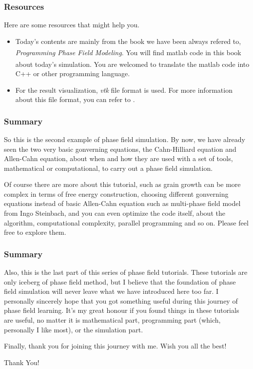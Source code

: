 \documentclass[compress,xcolor={dvipsnames}]{beamer}
\newcommand{\bhref}[2]{
    \href{#1}{\color{blue}{#2}}
}
\begin{document}
\begin{frame}
    \frametitle{Resources}

    Here are some resources that might help you.
    \begin{itemize}
        \item Today's contents are mainly from the book we have been always refered to, \emph{Programming Phase Field Modeling}. You will find matlab\textsuperscript{\textregistered} code in this book about today's simulation. You are welcomed to translate the matlab\textsuperscript{\textregistered} code into C++ or other programming language.
        \item For the result visualization, \emph{vtk} file format is used. For more information about this file format, you can refer to \bhref{https://docs.vtk.org/en/latest/design_documents/VTKFileFormats.html}{VTK file format reference}.
    \end{itemize}
\end{frame}

\begin{frame}
    \frametitle{Summary}

    So this is the second example of phase field simulation. By now, we have already seen the two very basic gonverning equations, the Cahn-Hilliard equation and Allen-Cahn equation, about when and how they are used with a set of tools, mathematical or computational, to carry out a phase field simulation.

    Of course there are more about this tutorial, such as grain growth can be more complex in terms of free energy construction, choosing different gonverning equations instead of basic Allen-Cahn equation such as multi-phase field model from Ingo Steinbach, and you can even optimize the code itself, about the algorithm, computational complexity, parallel programming and so on. Please feel free to explore them.

\end{frame}

\begin{frame}
    \frametitle{Summary}

    Also, this is the last part of this series of phase field tutorials. These tutorials are only iceberg of phase field method, but I believe that the foundation of phase field simulation will never leave what we have introduced here too far. I personally sincerely hope that you got something useful during this journey of phase field learning. It's my great honour if you found things in these tutorials are useful, no matter it is mathematical part, programming part (which, personally I like most), or the simulation part.

    Finally, thank you for joining this journey with me. Wish you all the best!

\end{frame}

\begin{frame}
    \begin{center}
        {\Huge \calligra Thank You!}
    \end{center}
\end{frame}
\end{document}
